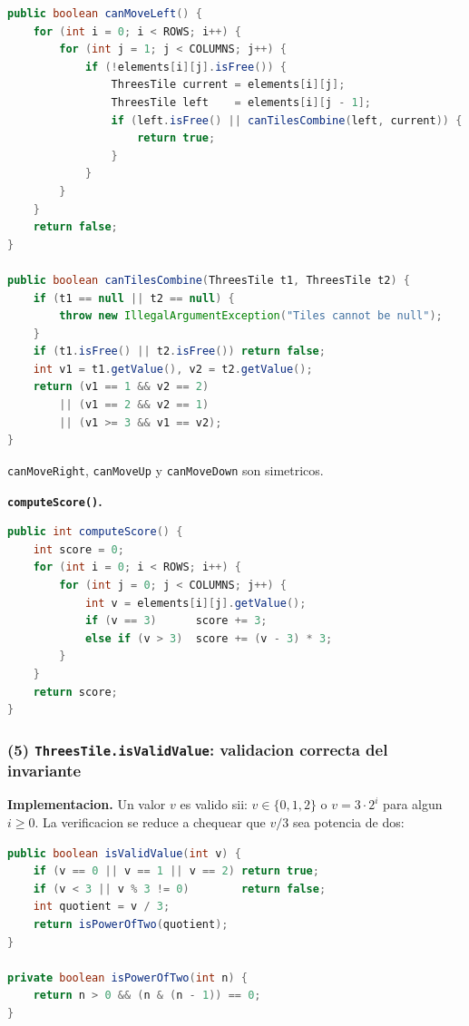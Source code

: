 \documentclass[12pt,a4paper]{article}
\begin{document}
\begin{lstlisting}[style=codestyle,language=Java]
public boolean canMoveLeft() {
    for (int i = 0; i < ROWS; i++) {
        for (int j = 1; j < COLUMNS; j++) {
            if (!elements[i][j].isFree()) {
                ThreesTile current = elements[i][j];
                ThreesTile left    = elements[i][j - 1];
                if (left.isFree() || canTilesCombine(left, current)) {
                    return true;
                }
            }
        }
    }
    return false;
}

public boolean canTilesCombine(ThreesTile t1, ThreesTile t2) {
    if (t1 == null || t2 == null) {
        throw new IllegalArgumentException("Tiles cannot be null");
    }
    if (t1.isFree() || t2.isFree()) return false;
    int v1 = t1.getValue(), v2 = t2.getValue();
    return (v1 == 1 && v2 == 2)
        || (v1 == 2 && v2 == 1)
        || (v1 >= 3 && v1 == v2);
}
\end{lstlisting}

\texttt{canMoveRight}, \texttt{canMoveUp} y \texttt{canMoveDown} son simetricos.

\textbf{\texttt{computeScore()}.}

\begin{lstlisting}[style=codestyle,language=Java]
public int computeScore() {
    int score = 0;
    for (int i = 0; i < ROWS; i++) {
        for (int j = 0; j < COLUMNS; j++) {
            int v = elements[i][j].getValue();
            if (v == 3)      score += 3;
            else if (v > 3)  score += (v - 3) * 3;
        }
    }
    return score;
}
\end{lstlisting}

\subsubsection*{(5) \texttt{ThreesTile.isValidValue}: validacion correcta del invariante}

\textbf{Implementacion.} Un valor $v$ es valido sii: $v \in \{0, 1, 2\}$ o $v = 3 \cdot 2^i$
para algun $i \ge 0$. La verificacion se reduce a chequear que $v/3$ sea potencia de dos:

\begin{lstlisting}[style=codestyle,language=Java]
public boolean isValidValue(int v) {
    if (v == 0 || v == 1 || v == 2) return true;
    if (v < 3 || v % 3 != 0)        return false;
    int quotient = v / 3;
    return isPowerOfTwo(quotient);
}

private boolean isPowerOfTwo(int n) {
    return n > 0 && (n & (n - 1)) == 0;
}
\end{lstlisting}
\end{document}
